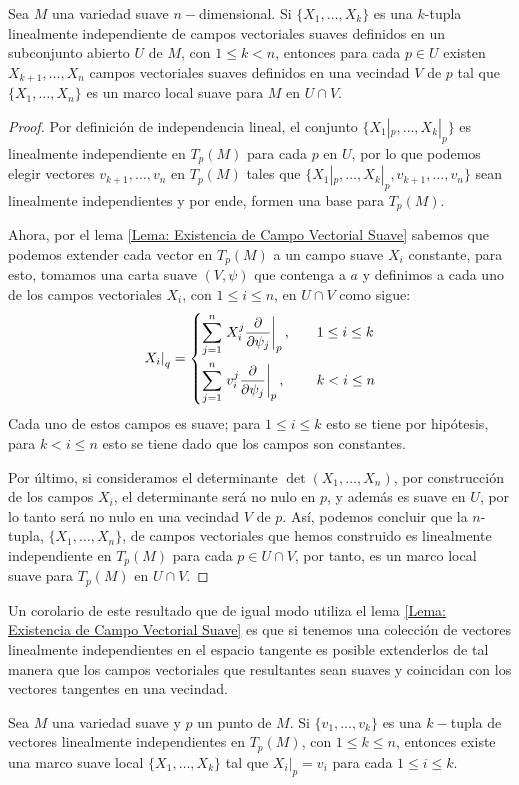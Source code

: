\begin{theorem}
	Sea $M$ una variedad suave $n-$dimensional. Si $\{X_1, \ldots, X_k\}$ es una $k$-tupla linealmente independiente de campos vectoriales suaves definidos en un subconjunto abierto $U$ de $M$, con $1 \leq k < n$, entonces para cada $p \in U$ existen $X_{k+1},\ldots, X_n$ campos vectoriales suaves definidos en una vecindad $V$ de $p$ tal que $\{X_1, \ldots, X_n\}$ es un marco local suave para $M$ en $U \cap V$.
\end{theorem}

\begin{proof}
	Por definición de independencia lineal, el conjunto $\{X_1|_p, \ldots, X_k|_p\}$ es linealmente independiente en $T_p(M)$ para cada $p$ en $U$, por lo que podemos elegir vectores $v_{k+1},\ldots,v_n$ en $T_p(M)$ tales que $\{X_1|_p, \ldots, X_k|_p, v_{k+1}, \ldots, v_n\}$ sean linealmente independientes y por ende, formen una base para $T_p(M)$.

  Ahora, por el lema \ref{Lema: Existencia de Campo Vectorial Suave} sabemos que podemos extender cada vector en $T_p(M)$ a un campo suave $X_i$ constante, para esto, tomamos una carta suave $(V,\psi)$ que contenga a $a$ y definimos a cada uno de los campos vectoriales $X_i$, con $1 \leq i \leq n$, en $U \cap V$ como sigue:
	\[
		\left. X_i \right|_q = \begin{dcases}
			\sum_{j=1}^{n}
			\left.
			X_i^j \frac{\partial}{\partial \psi_j}
			\right|_p, & \quad 1 \leq i \leq k \\
			\sum_{j=1}^{n}
			\left.
			v_i^j \frac{\partial}{\partial \psi_j}
			\right|_p, & \quad k < i \leq n
		\end{dcases}
	\]
	Cada uno de estos campos es suave; para $1 \leq i \leq k$ esto se tiene por hipótesis, para $k< i \leq n$ esto se tiene dado que los campos son constantes.

	Por último, si consideramos el determinante $\det(X_1, \ldots, X_n)$, por construcción de los campos $X_i$, el determinante será no nulo en $p$, y además es suave en $U$, por lo tanto será no nulo en una vecindad $V$ de $p$. Así, podemos concluir que la $n$-tupla, $\{X_1,\ldots,X_n\}$, de campos vectoriales que hemos construido es linealmente independiente en $T_p(M)$ para cada $p \in U \cap V$, por tanto, es un marco local suave para $T_p(M)$ en $U \cap V$.
\end{proof}

Un corolario de este resultado que de igual modo utiliza el lema \ref{Lema: Existencia de Campo Vectorial Suave} es que si tenemos una colección de vectores linealmente independientes en el espacio tangente es posible extenderlos de tal manera que los campos vectoriales que resultantes sean suaves y coincidan con los vectores tangentes en una vecindad.

\begin{corollary}
  Sea $M$ una variedad suave y $p$ un punto de $M$. Si $\{v_1, \ldots, v_k\}$ es una $k-$tupla de vectores linealmente independientes en $T_p(M)$, con $1 \leq k \leq n$, entonces existe una marco suave local 
  $\{X_1, \ldots, X_k\}$ tal que $X_i|_p = v_i$ para cada $1\leq i \leq k$.
\end{corollary}

